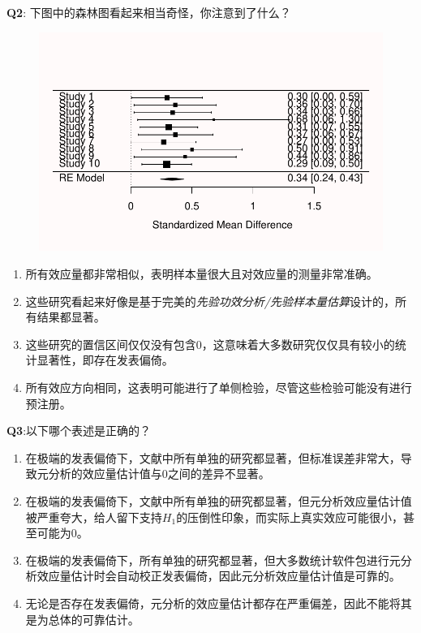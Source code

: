 \documentclass[
  letterpaper,
  DIV=11,
  numbers=noendperiod]{scrreprt}
\providecommand{\tightlist}{%
  \setlength{\itemsep}{0pt}\setlength{\parskip}{0pt}}\usepackage{longtable,booktabs,array}
\begin{document}
\textbf{Q2}: 下图中的森林图看起来相当奇怪，你注意到了什么？

\begin{figure}

{\centering \includegraphics[width=1\textwidth,height=\textheight]{12-bias_files/figure-pdf/metasimq2-1.pdf}

}

\end{figure}

\begin{enumerate}
\def\labelenumi{\Alph{enumi})}
\tightlist
\item
  所有效应量都非常相似，表明样本量很大且对效应量的测量非常准确。
\item
  这些研究看起来好像是基于完美的\emph{先验功效分析/先验样本量估算}设计的，所有结果都显著。
\item
  这些研究的置信区间仅仅没有包含0，这意味着大多数研究仅仅具有较小的统计显著性，即存在发表偏倚。
\item
  所有效应方向相同，这表明可能进行了单侧检验，尽管这些检验可能没有进行预注册。
\end{enumerate}

\textbf{Q3}:以下哪个表述是正确的？

\begin{enumerate}
\def\labelenumi{\Alph{enumi})}
\tightlist
\item
  在极端的发表偏倚下，文献中所有单独的研究都显著，但标准误差非常大，导致元分析的效应量估计值与0之间的差异不显著。
\item
  在极端的发表偏倚下，文献中所有单独的研究都显著，但元分析效应量估计值被严重夸大，给人留下支持\(H_1\)的压倒性印象，而实际上真实效应可能很小，甚至可能为0。
\item
  在极端的发表偏倚下，所有单独的研究都显著，但大多数统计软件包进行元分析效应量估计时会自动校正发表偏倚，因此元分析效应量估计值是可靠的。
\item
  无论是否存在发表偏倚，元分析的效应量估计都存在严重偏差，因此不能将其是为总体的可靠估计。
\end{enumerate}
\end{document}
